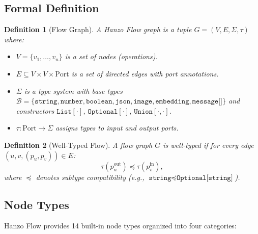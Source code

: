 \documentclass[11pt,twocolumn]{article}
\newtheorem{definition}{Definition}
\begin{document}
\subsection{Formal Definition}

\begin{definition}[Flow Graph]
A Hanzo Flow graph is a tuple $G = (V, E, \Sigma, \tau)$ where:
\begin{itemize}[leftmargin=1.1em]
    \item $V = \{v_1, \ldots, v_n\}$ is a set of nodes (operations).
    \item $E \subseteq V \times V \times \text{Port}$ is a set of directed edges with port annotations.
    \item $\Sigma$ is a type system with base types $\mathcal{B} = \{\texttt{string}, \texttt{number}, \texttt{boolean}, \texttt{json}, \texttt{image}, \texttt{embedding}, \texttt{message[]}\}$ and constructors $\texttt{List}[\cdot]$, $\texttt{Optional}[\cdot]$, $\texttt{Union}[\cdot, \cdot]$.
    \item $\tau : \text{Port} \to \Sigma$ assigns types to input and output ports.
\end{itemize}
\end{definition}

\begin{definition}[Well-Typed Flow]
A flow graph $G$ is well-typed if for every edge $(u, v, (p_u, p_v)) \in E$:
\begin{equation}
\tau(p_u^{\text{out}}) \preceq \tau(p_v^{\text{in}}),
\end{equation}
where $\preceq$ denotes subtype compatibility (e.g., $\texttt{string} \preceq \texttt{Optional[string]}$).
\end{definition}

\subsection{Node Types}

Hanzo Flow provides 14 built-in node types organized into four categories:
\end{document}
